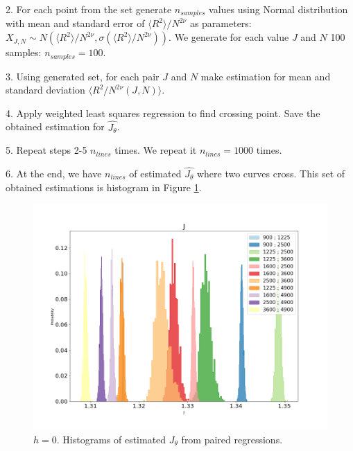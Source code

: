 2. For each point from the set generate $n_{samples}$ values using Normal distribution with mean and standard error of $\langle R^2 \rangle / N^ {2 \nu}$ as parameters: $ X_{J, N} \sim N (\langle R^2 \rangle / N^ {2 \nu}, \sigma (\langle R^2 \rangle / N^ {2 \nu}))$. We generate for each value $J$ and $N$ 100 samples: $n_{samples} = 100$. 

3. Using generated set, for each pair $J$ and $N$ make estimation for mean and standard deviation $\langle  R^2 / N^ {2 \nu} (J, N)\rangle$.

4. Apply weighted least squares regression to find crossing point. Save the obtained estimation for $\hat{J_{\theta}}$. 

5. Repeat steps 2-5 $n_{lines}$ times. We repeat it $n_{lines}=1000$ times. 

6. At the end, we have $n_{lines}$ of estimated $\hat{J_{\theta}}$ where two curves cross. This set of obtained estimations is histogram in Figure \ref{fig:Jthetahistogram}. 

 \begin{figure}
	\centering
	\includegraphics[scale=0.28]{Images/radius_hist_cov.png}
	\caption{$h=0$. Histograms of estimated $J_{\theta}$ from paired regressions.  }
	\label{fig:Jthetahistogram}
\end{figure}

